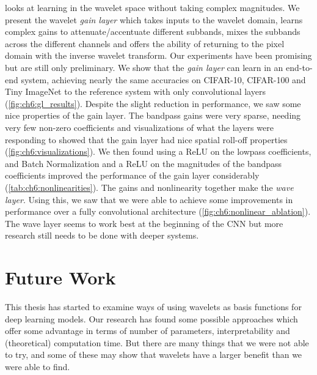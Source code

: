 \textbf{} looks at learning in the wavelet space without
taking complex magnitudes. We present the wavelet \emph{gain layer} which takes
inputs to the wavelet domain, learns complex gains to attenuate/accentuate
different subbands, mixes the subbands across the different channels and offers
the ability of returning to the pixel domain with the inverse wavelet transform.
Our experiments have been promising but are still only preliminary. We
show that the \emph{gain layer} can learn in an end-to-end system, achieving nearly
the same accuracies on CIFAR-10, CIFAR-100 and Tiny ImageNet to the reference system with
only convolutional layers (\autoref{fig:ch6:gl_results}).
Despite the slight reduction in performance, we saw some
nice properties of the gain layer. The bandpass gains were very sparse,
needing very few non-zero coefficients and visualizations of what the layers
were responding to showed that the gain layer had nice
spatial roll-off properties (\autoref{fig:ch6:visualizations}).
We then found using a ReLU on the lowpass coefficients, and
Batch Normalization and a ReLU on the magnitudes of the bandpass coefficients
improved the performance of the gain layer considerably (\autoref{tab:ch6:nonlinearities}).
The gains and nonlinearity together make the \emph{wave layer}. Using this, we
saw that we were able to achieve some improvements in performance over a fully
convolutional architecture (\autoref{fig:ch6:nonlinear_ablation}). The wave
layer seems to work best at the beginning of the CNN but more research still
needs to be done with deeper systems.

\section{Future Work}
This thesis has started to examine ways of using wavelets as basis functions for
deep learning models. Our research has found some possible approaches
which offer some advantage in terms of number of parameters, interpretability
and (theoretical) computation time. But there are many things that we were not
able to try, and some of these may show that wavelets have a larger benefit than
we were able to find.

